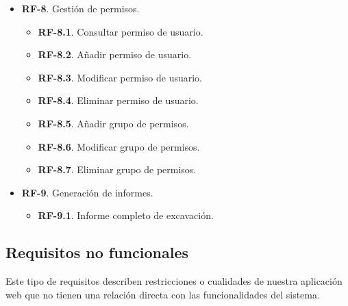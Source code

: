 \begin{itemize}
\begin{itemize}
\begin{itemize}
                    \end{itemize}
            \end{itemize}
        \item \textbf{RF-8}. Gestión de permisos.
            \begin{itemize}
                \item \textbf{RF-8.1}. Consultar permiso de usuario.
                \item \textbf{RF-8.2}. Añadir permiso de usuario.
                \item \textbf{RF-8.3}. Modificar permiso de usuario.
                \item \textbf{RF-8.4}. Eliminar permiso de usuario.
                \item \textbf{RF-8.5}. Añadir grupo de permisos.
                \item \textbf{RF-8.6}. Modificar grupo de permisos.
                \item \textbf{RF-8.7}. Eliminar grupo de permisos.
            \end{itemize}
        \item \textbf{RF-9}. Generación de informes.
            \begin{itemize}
                \item \textbf{RF-9.1}. Informe completo de excavación.
            \end{itemize}
    \end{itemize}

\subsection{Requisitos no funcionales}
Este tipo de requisitos describen restricciones o cualidades de nuestra aplicación web que
no tienen una relación directa con las funcionalidades del sistema.

